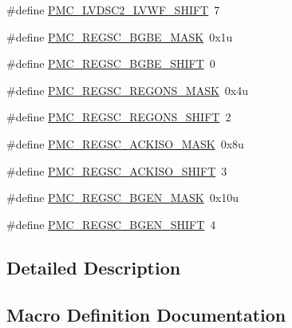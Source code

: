 \begin{DoxyCompactItemize}
\item 
\#define \hyperlink{group___p_m_c___register___masks_ga8bcfb9fc5fd4a92164b2aa6cdb6db77e}{P\+M\+C\+\_\+\+L\+V\+D\+S\+C2\+\_\+\+L\+V\+W\+F\+\_\+\+S\+H\+I\+FT}~7
\item 
\#define \hyperlink{group___p_m_c___register___masks_ga98cf5c98c133e20fb620faa6ca29d98e}{P\+M\+C\+\_\+\+R\+E\+G\+S\+C\+\_\+\+B\+G\+B\+E\+\_\+\+M\+A\+SK}~0x1u
\item 
\#define \hyperlink{group___p_m_c___register___masks_ga2e23aa8155158c86fc53ccd8baccf24d}{P\+M\+C\+\_\+\+R\+E\+G\+S\+C\+\_\+\+B\+G\+B\+E\+\_\+\+S\+H\+I\+FT}~0
\item 
\#define \hyperlink{group___p_m_c___register___masks_gab830f2c82eef6d0db7caab8ee5689ba6}{P\+M\+C\+\_\+\+R\+E\+G\+S\+C\+\_\+\+R\+E\+G\+O\+N\+S\+\_\+\+M\+A\+SK}~0x4u
\item 
\#define \hyperlink{group___p_m_c___register___masks_ga06b4e6d970f2610a635c92bb1270541d}{P\+M\+C\+\_\+\+R\+E\+G\+S\+C\+\_\+\+R\+E\+G\+O\+N\+S\+\_\+\+S\+H\+I\+FT}~2
\item 
\#define \hyperlink{group___p_m_c___register___masks_ga35ced6f0f133b2d5892bdcba3e0b2832}{P\+M\+C\+\_\+\+R\+E\+G\+S\+C\+\_\+\+A\+C\+K\+I\+S\+O\+\_\+\+M\+A\+SK}~0x8u
\item 
\#define \hyperlink{group___p_m_c___register___masks_gad2b9b6ce6aa455e8607fd3c2d1647544}{P\+M\+C\+\_\+\+R\+E\+G\+S\+C\+\_\+\+A\+C\+K\+I\+S\+O\+\_\+\+S\+H\+I\+FT}~3
\item 
\#define \hyperlink{group___p_m_c___register___masks_ga7e1520a56f4d2675018d5efaa9492f19}{P\+M\+C\+\_\+\+R\+E\+G\+S\+C\+\_\+\+B\+G\+E\+N\+\_\+\+M\+A\+SK}~0x10u
\item 
\#define \hyperlink{group___p_m_c___register___masks_gab43d258e6864ee3a7a728de1d720f6fe}{P\+M\+C\+\_\+\+R\+E\+G\+S\+C\+\_\+\+B\+G\+E\+N\+\_\+\+S\+H\+I\+FT}~4
\end{DoxyCompactItemize}


\subsection{Detailed Description}


\subsection{Macro Definition Documentation}
